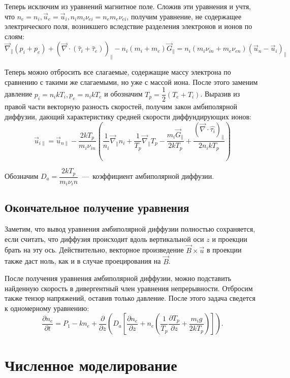 \documentclass[14pt, a4paper, fleqn, twoside]{extreport}
\theoremstyle{definiton}
\theoremstyle{definition}
\begin{document}
Теперь исключим из уравнений магнитное поле. Сложив эти уравнения и учтя, что $n_e=n_i, \vec{u}_e=\vec{u}_i, n_im_i\nu_{ei}=n_em_e\nu_{ei}$, получим уравнение, не содержащее электрического поля, возникшего вследствие разделения электронов и ионов по слоям:
$$\vec{\nabla}_\parallel (p_i+p_e) + (\vec{\nabla}\cdot (\hat{\tau}_i+\hat{\tau}_e))_\parallel-n_i(m_i+m_e)\vec{G}_\parallel=n_i(m_i\nu_{in}+m_e\nu_{en})(\vec{u}_n-\vec{u}_i)_\parallel$$

Теперь можно отбросить все слагаемые, содержащие массу электрона по сравнению с такими же слагаемыми, но уже с массой иона. После этого заменим давление $p_i=n_ikT_i, p_e=n_ikT_e$ и обозначим $T_p=\dfrac{1}{2}(T_e+T_i)$. Выразив из правой части векторную разность скоростей, получим закон амбиполярной диффузии, дающий характеристику средней скорости диффундирующих ионов: 
$$\vec{u}_{i\parallel} = \vec{u}_{n\parallel} - \dfrac{2kT_p}{m_i\nu_{in}}\left(\dfrac{1}{n_i}\vec{\nabla}_\parallel n_i+\dfrac{1}{T_p}\vec{\nabla}_\parallel T_p-\dfrac{m_i\vec{G}_\parallel}{2kT_p}+\dfrac{(\vec{\nabla}\cdot\hat{\tau_i})_\parallel}{2n_ikT_p}\right)$$

Обозначим $D_a=\dfrac{2kT_p}{m_i\nu_in}$~---~коэффициент амбиполярной диффузии.

\subsection*{Окончательное получение уравнения}

Заметим, что вывод уравнения амбиполярной диффузии полностью сохраняется, если считать, что диффузия происходит вдоль вертикальной оси $z$ и проекции брать на эту ось. Действительно, векторное произведение $\vec{B}\times\vec{u}$ в проекции также даст ноль, как и в случае проецирования на $\vec{B}$.

После получения уравнения амбиполярной диффузии, можно подставить найденную скорость в дивергентный член уравнения непрерывности. Отбросим также тензор напряжений, оставив только давление. После этого задача сведется к одномерному уравнению:
$$\dfrac{\partial n_e}{\partial t}=P_1-kn_e + \dfrac{\partial}{\partial z}\left(D_a\left[\dfrac{\partial n_e}{\partial z}+n_e\left(\dfrac{1}{T_p}\dfrac{\partial T_p}{\partial z}+\dfrac{m_ig}{2kT_p}\right)\right]\right).$$

\newpage

\section*{Численное моделирование}
\end{document}
